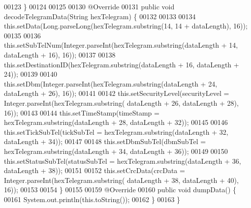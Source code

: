 \begin{DoxyCode}
00123     \}
00124 
00125 
00130     @Override
00131     \textcolor{keyword}{public} \textcolor{keywordtype}{void} decodeTelegramData(String hexTelegram) \{
00132 
00133 
00134         this.setData(Long.parseLong(hexTelegram.substring(14, 14 + dataLength), 16));
00135 
00136         this.setSubTelNum(Integer.parseInt(hexTelegram.substring(dataLength + 14, 
      dataLength + 16), 16));
00137 
00138         this.setDestinationID(hexTelegram.substring(dataLength + 16, dataLength + 24));
00139 
00140         this.setDbm(Integer.parseInt(hexTelegram.substring(dataLength + 24, 
      dataLength + 26), 16));
00141 
00142         this.setSecurityLevel(securityLevel = Integer.parseInt(hexTelegram.substring(
      dataLength + 26, dataLength + 28), 16));
00143 
00144         this.setTimeStamp(timeStamp = hexTelegram.substring(dataLength + 28, 
      dataLength + 32));
00145 
00146         this.setTickSubTel(tickSubTel = hexTelegram.substring(dataLength + 32, 
      dataLength + 34));
00147 
00148         this.setDbmSubTel(dbmSubTel = hexTelegram.substring(dataLength + 34, 
      dataLength + 36));
00149 
00150         this.setStatusSubTel(statusSubTel = hexTelegram.substring(dataLength + 36, 
      dataLength + 38));
00151 
00152         this.setCrcData(crcData = Integer.parseInt(hexTelegram.substring(
      dataLength + 38, dataLength + 40), 16));
00153 
00154     \}
00155 
00159     @Override
00160     \textcolor{keyword}{public} \textcolor{keywordtype}{void} dumpData() \{
00161         System.out.println(this.toString());
00162     \}
00163 \}
\end{DoxyCode}
